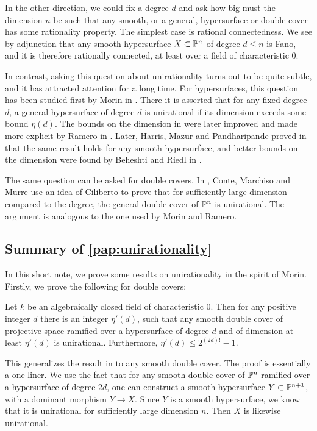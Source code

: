 In the other direction, we could fix a degree $d$ and ask how big must the dimension $n$ be such that any smooth, or a general, hypersurface or double cover has some rationality property. The simplest case is rational connectedness. We see by adjunction that any smooth hypersurface $X \subset \P^n$ of degree $d \leq n$ is Fano, and it is therefore rationally connected, at least over a field of characteristic 0.

In contrast, asking this question about unirationality turns out to be quite subtle, and it has attracted attention for a long time. For hypersurfaces, this question has been studied first by Morin in \cite{MorinUnirationality}. There it is asserted that for any fixed degree $d$, a general hypersurface of degree $d$ is unirational if its dimension exceeds some bound $\eta(d)$. The bounds on the dimension in \cite{MorinUnirationality} were later improved and made more explicit by Ramero in \cite{Ramero}. Later, Harris, Mazur and Pandharipande proved in \cite{HMPUnirationality} that the same result holds for any smooth hypersurface, and better bounds on the dimension were found by Beheshti and Riedl in \cite[Corollary 4.6]{BRHypersurface}.

The same question can be asked for double covers. In \cite{CMMDoubleCover}, Conte, Marchiso and Murre use an idea of Ciliberto to prove that for sufficiently large dimension compared to the degree, the general double cover of $\P^n$ is unirational. The argument is analogous to the one used by Morin and Ramero.

\subsection{Summary of \cref{pap:unirationality}}
In this short note, we prove some results on unirationality in the spirit of Morin. Firstly, we prove the following for double covers:
\begin{theorem}
	Let $k$ be an algebraically closed field of characteristic 0. Then for any positive integer $d$ there is an integer $\eta'(d)$, such that any smooth double cover of projective space ramified over a hypersurface of degree $d$ and of dimension at least $\eta'(d)$ is unirational. Furthermore, $\eta'(d) \leq 2^{(2d)!} - 1$.
\end{theorem}
This generalizes the result in \cite{CMMDoubleCover} to any smooth double cover. The proof is essentially a one-liner. We use the fact that for any smooth double cover of $\P^n$ ramified over a hypersurface of degree $2d$, one can construct a smooth hypersurface $Y \subset \P^{n+1}$, with a dominant morphism $Y \to X$. Since $Y$ is a smooth hypersurface, we know that it is unirational for sufficiently large dimension $n$. Then $X$ is likewise unirational.

